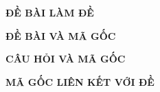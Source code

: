 \documentclass[11pt]{article}
\begin{document}
\setlength{\baselineskip}{12truept}
\def\v#1{\overrightarrow{#1}} %
\renewcommand{\contentsname}{ }

\lamtieude
{}
\indebailoigiai
{}
\begin{center}
\textbf{ĐỀ BÀI LÀM ĐỀ}
\end{center}
\begin{enumerate}[]
 \end{enumerate}
\label{DebaiPage}

\newpage
\setcounter{page}{1}
\indebai
\lamtieude
\begin{center}
\textbf{ĐỀ BÀI VÀ MÃ GỐC}
\end{center}
\begin{enumerate}[]
\foreachproblem[bttracnghiem]{\item\causo[\textcolor{red}{\textbf{\thisproblemlabel}}]\thisproblem}
 \end{enumerate}
\label{magocPage}

\newpage
\thispagestyle{empty}
\lamtieude
\indebai
\begin{center}
\textbf{CÂU HỎI VÀ MÃ GỐC}
\end{center}
\begin{multicols}{3}
\begin{enumerate}[]
\foreachproblem[bttracnghiem]{\item\causo\textcolor{red}{\textbf{\thisproblemlabel}}}
 \end{enumerate}
\end{multicols}

\newpage
\thispagestyle{empty}
\lamtieude
\begin{center}
\textbf{MÃ GỐC LIÊN KẾT VỚI ĐỀ}
\end{center}
\begin{multicols}{3}
\tableofcontents[MÃ ĐỀ THI]
\end{multicols}
\end{document}
